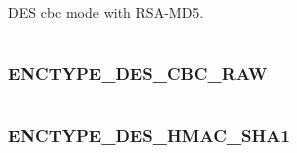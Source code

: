 \documentclass[letterpaper,10pt,english]{sphinxmanual}
\begin{document}
\begin{fulllineitems}
\label{appdev/refs/macros/ENCTYPE_DES_CBC_MD5:ENCTYPE_DES_CBC_MD5}
\end{fulllineitems}


DES cbc mode with RSA-MD5.

\begin{tabulary}{\linewidth}{|L|L|}
\hline

 & 
\\\hline
\end{tabulary}



\subsubsection{ENCTYPE\_DES\_CBC\_RAW}
\label{appdev/refs/macros/ENCTYPE_DES_CBC_RAW:enctype-des-cbc-raw-data}\label{appdev/refs/macros/ENCTYPE_DES_CBC_RAW:enctype-des-cbc-raw}\label{appdev/refs/macros/ENCTYPE_DES_CBC_RAW::doc}

\begin{fulllineitems}
\label{appdev/refs/macros/ENCTYPE_DES_CBC_RAW:ENCTYPE_DES_CBC_RAW}
\end{fulllineitems}


\begin{tabulary}{\linewidth}{|L|L|}
\hline

 & 
\\\hline
\end{tabulary}



\subsubsection{ENCTYPE\_DES\_HMAC\_SHA1}
\label{appdev/refs/macros/ENCTYPE_DES_HMAC_SHA1:enctype-des-hmac-sha1-data}\label{appdev/refs/macros/ENCTYPE_DES_HMAC_SHA1::doc}\label{appdev/refs/macros/ENCTYPE_DES_HMAC_SHA1:enctype-des-hmac-sha1}

\begin{fulllineitems}
\label{appdev/refs/macros/ENCTYPE_DES_HMAC_SHA1:ENCTYPE_DES_HMAC_SHA1}
\end{fulllineitems}
\end{document}
